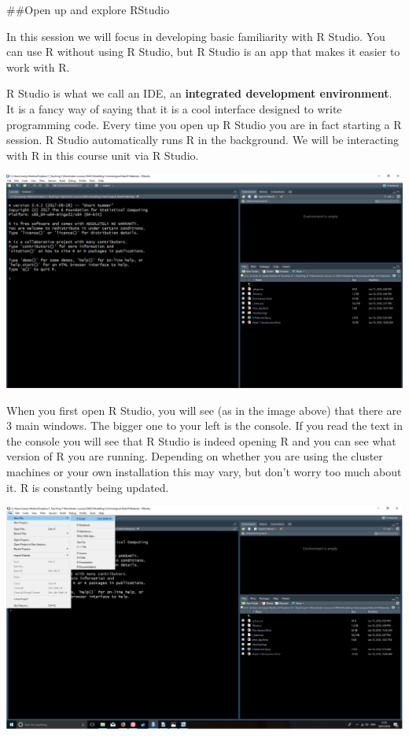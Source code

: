 \documentclass[]{book}
\theoremstyle{definition}
\theoremstyle{definition}
\theoremstyle{definition}
\theoremstyle{remark}
\begin{document}
\#\#Open up and explore RStudio

In this session we will focus in developing basic familiarity with R
Studio. You can use R without using R Studio, but R Studio is an app
that makes it easier to work with R.

R Studio is what we call an IDE, an \textbf{integrated development
environment}. It is a fancy way of saying that it is a cool interface
designed to write programming code. Every time you open up R Studio you
are in fact starting a R session. R Studio automatically runs R in the
background. We will be interacting with R in this course unit via R
Studio.

\includegraphics{imgs/rstudio.PNG}

When you first open R Studio, you will see (as in the image above) that
there are 3 main windows. The bigger one to your left is the console. If
you read the text in the console you will see that R Studio is indeed
opening R and you can see what version of R you are running. Depending
on whether you are using the cluster machines or your own installation
this may vary, but don't worry too much about it. R is constantly being
updated.

\includegraphics{imgs/openscript.png}
\end{document}
